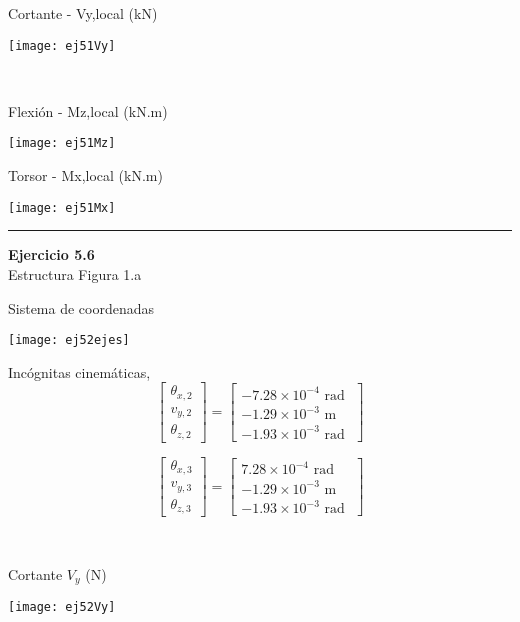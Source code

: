 \vspace{5mm}

\begin{minipage}{0.45\textwidth}
Cortante - Vy,local (kN)

\texttt{[image: ej51Vy]}
\end{minipage}
~
\begin{minipage}{0.45\textwidth}
Flexión - Mz,local (kN.m)

\texttt{[image: ej51Mz]}
\end{minipage}


\begin{center}
Torsor - Mx,local (kN.m)

\texttt{[image: ej51Mx]}
\end{center}




\hrule 
\vspace{5mm}
\textbf{Ejercicio 5.6}\\

Estructura Figura 1.a

Sistema de coordenadas
\begin{center}
\texttt{[image: ej52ejes]}
\end{center}


\begin{minipage}{0.45\textwidth}
	Incógnitas cinemáticas,
$$
\left[
\begin{matrix}
\theta_{x,2} \\
v_{y,2} \\
\theta_{z,2}
\end{matrix}
\right]
=
\left[
\begin{matrix}
-7.28\times 10^{-4} \text{ rad }\\
-1.29\times 10^{-3} \text{ m }\\
-1.93\times 10^{-3} \text{ rad }
\end{matrix}
\right]
$$

$$
\left[
\begin{matrix}
\theta_{x,3} \\
v_{y,3} \\
\theta_{z,3}
\end{matrix}
\right]
=
\left[
\begin{matrix}
 7.28\times 10^{-4} \text{ rad }\\
-1.29\times 10^{-3} \text{ m }\\
-1.93\times 10^{-3} \text{ rad }
\end{matrix}
\right]
$$
\end{minipage}
~
\begin{minipage}{0.45\textwidth}
Cortante $V_y$ (N)

\texttt{[image: ej52Vy]}
\end{minipage}


